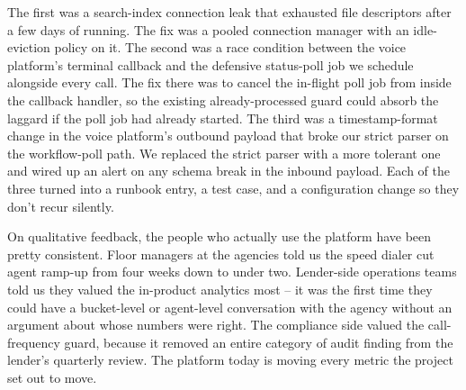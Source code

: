The first was a search-index connection leak that exhausted file descriptors after a few days of running. The fix was a pooled connection manager with an idle-eviction policy on it. The second was a race condition between the voice platform's terminal callback and the defensive status-poll job we schedule alongside every call. The fix there was to cancel the in-flight poll job from inside the callback handler, so the existing already-processed guard could absorb the laggard if the poll job had already started. The third was a timestamp-format change in the voice platform's outbound payload that broke our strict parser on the workflow-poll path. We replaced the strict parser with a more tolerant one and wired up an alert on any schema break in the inbound payload. Each of the three turned into a runbook entry, a test case, and a configuration change so they don't recur silently.

On qualitative feedback, the people who actually use the platform have been pretty consistent. Floor managers at the agencies told us the speed dialer cut agent ramp-up from four weeks down to under two. Lender-side operations teams told us they valued the in-product analytics most -- it was the first time they could have a bucket-level or agent-level conversation with the agency without an argument about whose numbers were right. The compliance side valued the call-frequency guard, because it removed an entire category of audit finding from the lender's quarterly review. The platform today is moving every metric the project set out to move.
